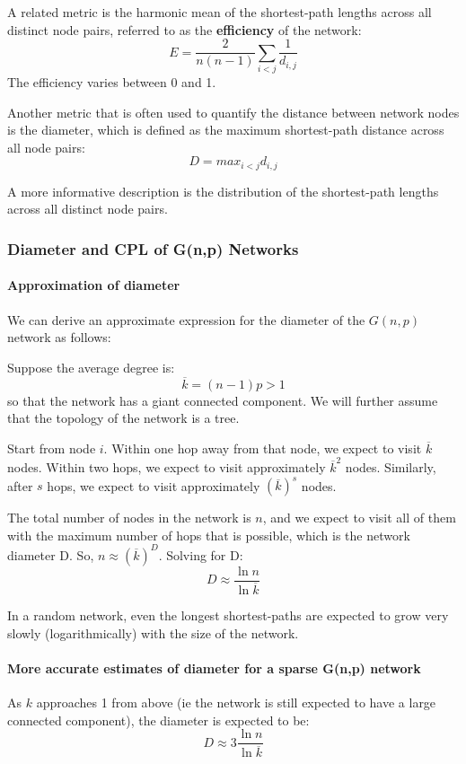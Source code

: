 \documentclass[11pt]{scrartcl} %
\begin{document}
A related metric is the harmonic mean of the shortest-path lengths across all distinct node pairs, referred to as the \textbf{efficiency} of the network:
\[ E = \frac{2}{n(n-1)} \sum_{i<j} \frac{1}{d_{i,j}} \]
The efficiency varies between 0 and 1.

Another metric that is often used to quantify the distance between network nodes is the diameter, which is defined as the maximum shortest-path distance across all node pairs:
\[ D = max_{i<j} d_{i,j}\]

A more informative description is the distribution of the shortest-path lengths across all distinct node pairs.

\subsubsection{Diameter and CPL of G(n,p) Networks}
\paragraph{Approximation of diameter}
We can derive an approximate expression for the diameter of the $G(n,p)$ network as follows:

Suppose the average degree is:
\[ \overline{k} = (n-1) p > 1 \]
so that the network has a giant connected component. We will further assume that the topology of the network is a tree.

Start from node $i$. Within one hop away from that node, we expect to visit $\overline{k}$ nodes. Within two hops, we expect to visit approximately $\overline{k}^2$ nodes. Similarly, after $s$ hops, we expect to visit approximately $(\overline{k})^s$ nodes.

The total number of nodes in the network is $n$,  and we expect to visit all of them with the maximum number of hops that is possible, which is the network diameter D. So, $n \approx (\overline{k})^D$. Solving for D:
\[ D \approx \frac{\ln n}{\ln \overline{k}} \]

In a random network, even the longest shortest-paths are expected to grow very slowly (logarithmically) with the size of the network.

\paragraph{More accurate estimates of diameter for a sparse G(n,p) network}
As $k$ approaches 1 from above (ie the network is still expected to have a large connected component), the diameter is expected to be:
\[ D \approx 3 \frac{\ln n}{\ln \overline{k}} \]
\end{document}
